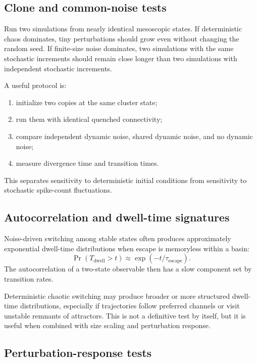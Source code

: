 \subsection{Clone and common-noise tests}

Run two simulations from nearly identical mesoscopic states. If deterministic chaos dominates, tiny perturbations should grow even without changing the random seed. If finite-size noise dominates, two simulations with the same stochastic increments should remain close longer than two simulations with independent stochastic increments.

A useful protocol is:
%
\begin{enumerate}[leftmargin=*]
  \item initialize two copies at the same cluster state;
  \item run them with identical quenched connectivity;
  \item compare independent dynamic noise, shared dynamic noise, and no dynamic noise;
  \item measure divergence time and transition times.
\end{enumerate}
%
This separates sensitivity to deterministic initial conditions from sensitivity to stochastic spike-count fluctuations.

\subsection{Autocorrelation and dwell-time signatures}

Noise-driven switching among stable states often produces approximately exponential dwell-time distributions when escape is memoryless within a basin:
%
\begin{equation}
  \Pr(T_{\mathrm{dwell}}>t)
  \approx
  \exp(-t/\tau_{\mathrm{escape}}).
  \label{eq:ch09-exponential-dwell-survival}
\end{equation}
%
The autocorrelation of a two-state observable then has a slow component set by transition rates.

Deterministic chaotic switching may produce broader or more structured dwell-time distributions, especially if trajectories follow preferred channels or visit unstable remnants of attractors. This is not a definitive test by itself, but it is useful when combined with size scaling and perturbation response.

\subsection{Perturbation-response tests}

